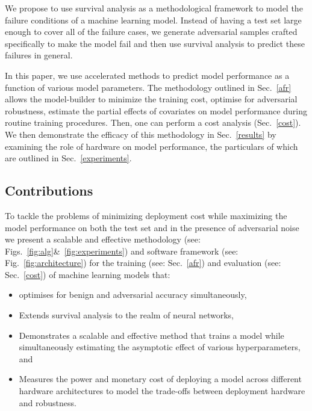\documentclass[journal]{IEEEtran}
\begin{document}
We propose to use survival analysis as a methodological framework to model the failure conditions of a machine learning model. Instead of having a test set large enough to cover all of the failure cases, we generate adversarial samples crafted specifically to make the model fail and then use survival analysis to predict these failures in general.

In this paper, we use accelerated methods to predict model performance as a function of various model parameters. The methodology outlined in Sec.~\ref{afr} allows the model-builder to minimize the training cost, optimise for adversarial robustness, estimate the partial effects of covariates on model performance during routine training procedures. Then, one can perform a cost analysis (Sec.~\ref{cost}). We then demonstrate the efficacy of this methodology in Sec.~\ref{results} by examining the role of hardware on model performance, the particulars of which are outlined in Sec.~\ref{experiments}.


\subsection{Contributions}
To tackle the problems of minimizing deployment cost while maximizing the model performance on both the test set and in the presence of adversarial noise we present a scalable and effective methodology (see: Figs.~\ref{fig:alg}\&~\ref{fig:experiments}) and software framework (see: Fig.~\ref{fig:architecture}) for the training (see: Sec.~\ref{afr}) and evaluation (see: Sec.~\ref{cost}) of machine learning models that:
\begin{itemize}
    \item optimises for benign and adversarial accuracy simultaneously,
    \item Extends survival analysis to the realm of neural networks, 
    \item Demonstrates a scalable and effective method that trains a model while simultaneously estimating the asymptotic effect of various hyperparameters, and
    \item Measures the power and monetary cost of deploying a model across different hardware architectures to model the trade-offs between deployment hardware and robustness.   
\end{itemize}
\end{document}
